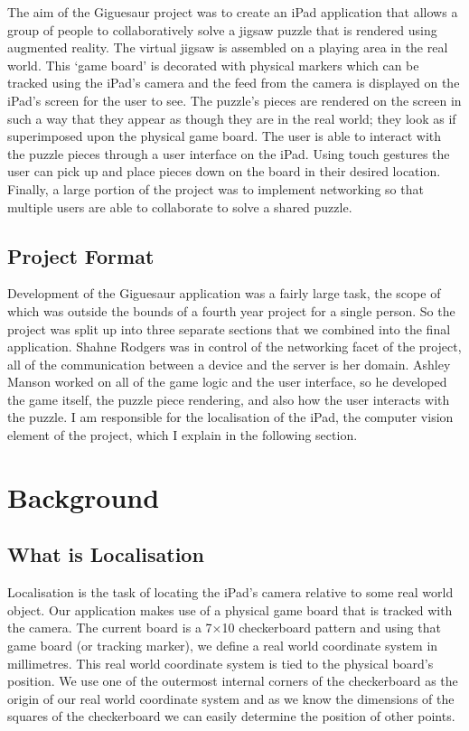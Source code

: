 \documentclass{article}
\begin{document}
The aim of the Giguesaur project was to create an iPad application that allows a group of people to collaboratively solve a jigsaw puzzle that is rendered using augmented reality. The virtual jigsaw is assembled on a playing area in the real world. This `game board' is decorated with physical markers which can be tracked using the iPad's camera and the feed from the camera is displayed on the iPad's screen for the user to see. The puzzle's pieces are rendered on the screen in such a way that they appear as though they are in the real world; they look as if superimposed upon the physical game board. The user is able to interact with the puzzle pieces through a user interface on the iPad. Using touch gestures the user can pick up and place pieces down on the board in their desired location. Finally, a large portion of the project was to implement networking so that multiple users are able to collaborate to solve a shared puzzle. %

\subsection{Project Format}

Development of the Giguesaur application was a fairly large task, the scope of which was outside the bounds of a fourth year project for a single person. So the project was split up into three separate sections that we combined into the final application. Shahne Rodgers was in control of the networking facet of the project, all of the communication between a device and the server is her domain. Ashley Manson worked on all of the game logic and the user interface, so he developed the game itself, the puzzle piece rendering, and also how the user interacts with the puzzle. I am responsible for the localisation of the iPad, the computer vision element of the project, which I explain in the following section. 


\section{Background}
\subsection{What is Localisation}

Localisation is the task of locating the iPad's camera relative to some real world object. Our application makes use of a physical game board that is tracked with the camera. The current board is a 7$\times$10 checkerboard pattern and using that game board (or tracking marker), we define a real world coordinate system in millimetres. This real world coordinate system is tied to the physical board's position. We use one of the outermost internal corners of the checkerboard as the origin of our real world coordinate system and as we know the dimensions of the squares of the checkerboard we can easily determine the position of other points. \par
\end{document}
